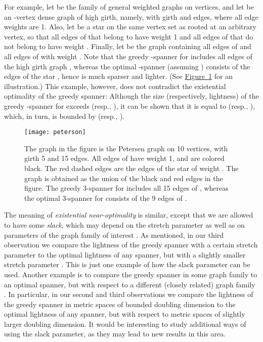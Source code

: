 \documentclass[11pt,letterpaper]{article}
\newcommand{\namedref}[2]{\hyperref[#2]{#1~\ref*{#2}}}
\newcommand{\figureref}[1]{\namedref{Figure}{#1}}
\begin{document}
{For example, let  be the family of general weighted graphs on  vertices, and let  be an -vertex dense graph of high girth,
	namely, with girth  and  edges, where all edge weights are 1.
	Also, let  be a star on the same vertex set as  rooted at an arbitrary vertex,
	so that all edges of  that belong to  have weight 1 and all edges of  that do not belong to  have weight .
	Finally, let  be the graph containing all edges of  and all edges of  with weight .
	Note that the greedy -spanner for  includes all  edges of the high girth graph ,
	whereas the optimal -spanner (assuming ) consists of the edges of the star , hence is much sparser and lighter.
	(See \figureref{fig:girth} for an illustration.)
	This example, however, does not contradict the existential optimality of the greedy spanner: Although
	the size (respectively, lightness) of the greedy -spanner for  exceeds  (resp., ), it can be shown that it is equal to
	 (resp., ), which, in turn, is bounded by   (resp., ).}
\begin{figure}
	\begin{center}
		\texttt{[image: peterson]}
		\caption{\small  The graph  in the figure is the Petersen graph on 10 vertices, with girth 5 and 15 edges.
			All edges of  have weight 1, and are colored black.
			The red dashed edges are the edges of the star  of weight .
			The graph  is obtained as the union of the black and red edges in the figure.
			The greedy 3-spanner for  includes all 15 edges of , whereas the optimal 3-spanner for  consists of the 9 edges of .}				
		\label{fig:girth}
	\end{center}
\end{figure}


The meaning of \emph{existential near-optimality} is similar, except that we are allowed to have some \emph{slack},
which may depend on the stretch parameter  as well as on parameters of the graph family of interest .
As mentioned, in our third observation we compare the lightness of the greedy spanner with a certain stretch parameter 
to the optimal lightness of any spanner, but with a slightly smaller stretch parameter .
This is just one example of how the slack parameter can be used.
Another example is to compare the greedy spanner in some graph family  to an optimal spanner, but with respect to a different (closely related) graph family .
In particular, in our second and third observations we compare the lightness of the greedy spanner in metric spaces of bounded doubling dimension
to the optimal lightness of any spanner, but with respect to metric spaces of slightly larger doubling dimension.
It would be interesting to study additional ways of using the slack parameter,
as they may lead to new results in this area.
\end{document}
